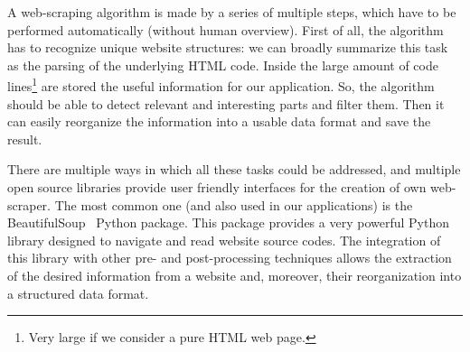 \documentclass{standalone}
\begin{document}
A \textsf{web-scraping} algorithm is made by a series of multiple steps, which have to be performed automatically (without human overview).
First of all, the algorithm has to recognize unique website structures: we can broadly summarize this task as the parsing of the underlying \textsf{HTML} code.
Inside the large amount of code lines\footnote{
  Very large if we consider a pure \textsf{HTML} web page.
} are stored the useful information for our application.
So, the algorithm should be able to detect relevant and interesting parts and filter them.
Then it can easily reorganize the information into a usable data format and save the result.

There are multiple ways in which all these tasks could be addressed, and multiple open source libraries provide user friendly interfaces for the creation of own web-scraper.
The most common one (and also used in our applications) is the \textsf{BeautifulSoup}~\cite{richardson2007beautiful} \textsf{Python} package.
This package provides a very powerful \textsf{Python} library designed to navigate and read website source codes.
The integration of this library with other pre- and post-processing techniques allows the extraction of the desired information from a website and, moreover, their reorganization into a structured data format.
\end{document}
